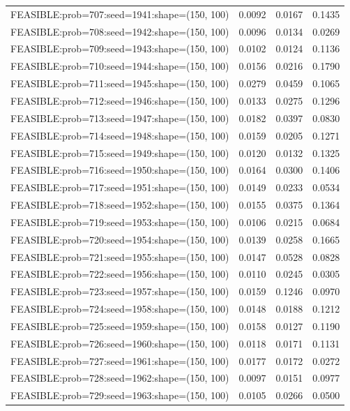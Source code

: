 \begin{longtable}{lccc}
FEASIBLE:prob=707:seed=1941:shape=(150, 100) & 0.0092 & 0.0167 & 0.1435 \\
FEASIBLE:prob=708:seed=1942:shape=(150, 100) & 0.0096 & 0.0134 & 0.0269 \\
FEASIBLE:prob=709:seed=1943:shape=(150, 100) & 0.0102 & 0.0124 & 0.1136 \\
FEASIBLE:prob=710:seed=1944:shape=(150, 100) & 0.0156 & 0.0216 & 0.1790 \\
FEASIBLE:prob=711:seed=1945:shape=(150, 100) & 0.0279 & 0.0459 & 0.1065 \\
FEASIBLE:prob=712:seed=1946:shape=(150, 100) & 0.0133 & 0.0275 & 0.1296 \\
FEASIBLE:prob=713:seed=1947:shape=(150, 100) & 0.0182 & 0.0397 & 0.0830 \\
FEASIBLE:prob=714:seed=1948:shape=(150, 100) & 0.0159 & 0.0205 & 0.1271 \\
FEASIBLE:prob=715:seed=1949:shape=(150, 100) & 0.0120 & 0.0132 & 0.1325 \\
FEASIBLE:prob=716:seed=1950:shape=(150, 100) & 0.0164 & 0.0300 & 0.1406 \\
FEASIBLE:prob=717:seed=1951:shape=(150, 100) & 0.0149 & 0.0233 & 0.0534 \\
FEASIBLE:prob=718:seed=1952:shape=(150, 100) & 0.0155 & 0.0375 & 0.1364 \\
FEASIBLE:prob=719:seed=1953:shape=(150, 100) & 0.0106 & 0.0215 & 0.0684 \\
FEASIBLE:prob=720:seed=1954:shape=(150, 100) & 0.0139 & 0.0258 & 0.1665 \\
FEASIBLE:prob=721:seed=1955:shape=(150, 100) & 0.0147 & 0.0528 & 0.0828 \\
FEASIBLE:prob=722:seed=1956:shape=(150, 100) & 0.0110 & 0.0245 & 0.0305 \\
FEASIBLE:prob=723:seed=1957:shape=(150, 100) & 0.0159 & 0.1246 & 0.0970 \\
FEASIBLE:prob=724:seed=1958:shape=(150, 100) & 0.0148 & 0.0188 & 0.1212 \\
FEASIBLE:prob=725:seed=1959:shape=(150, 100) & 0.0158 & 0.0127 & 0.1190 \\
FEASIBLE:prob=726:seed=1960:shape=(150, 100) & 0.0118 & 0.0171 & 0.1131 \\
FEASIBLE:prob=727:seed=1961:shape=(150, 100) & 0.0177 & 0.0172 & 0.0272 \\
FEASIBLE:prob=728:seed=1962:shape=(150, 100) & 0.0097 & 0.0151 & 0.0977 \\
FEASIBLE:prob=729:seed=1963:shape=(150, 100) & 0.0105 & 0.0266 & 0.0500 \\

\end{longtable}
